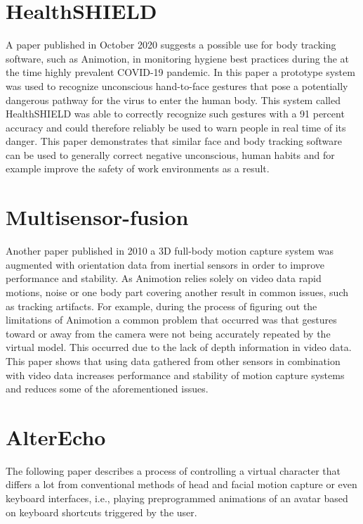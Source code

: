 \section{HealthSHIELD}
A paper published in October 2020 suggests a possible use for body tracking software, such as Animotion, in monitoring hygiene best practices during the at the time highly 
prevalent COVID-19 pandemic. In this paper a prototype system was used to recognize unconscious hand-to-face gestures that pose a potentially dangerous pathway for the virus
to enter the human body. This system called HealthSHIELD was able to correctly recognize such gestures with a 91 percent accuracy and could therefore reliably be used to warn
people in real time of its danger. This paper demonstrates that similar face and body tracking software can be used to generally correct negative unconscious, human habits
and for example improve the safety of work environments as a result.

\section{Multisensor-fusion}
Another paper published in 2010 a 3D full-body motion capture system was augmented with orientation data from inertial sensors in order to improve performance and stability.
As Animotion relies solely on video data rapid motions, noise or one body part covering another result in common issues, such as tracking artifacts. For example, during the
process of figuring out the limitations of Animotion a common problem that occurred was that gestures toward or away from the camera were not being accurately repeated by the
virtual model. This occurred due to the lack of depth information in video data. This paper shows that using data gathered from other sensors in combination with video data
increases performance and stability of motion capture systems and reduces some of the aforementioned issues.

\section{AlterEcho}
The following paper describes a process of controlling a virtual character that differs a lot from conventional methods of head and facial motion capture or even keyboard
interfaces, i.e., playing preprogrammed animations of an avatar based on keyboard shortcuts triggered by the user.

